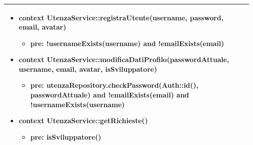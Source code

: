 \begin{tabular}{|| l | p{34em} ||}
\begin{itemize}[leftmargin=*]
	\item \textbf{context} UtenzaService::registraUtente(username, password, email, avatar)
	\begin{itemize}
		\item[ ] \textbf{pre:} !usernameExists(username) and !emailExists(email)
	\end{itemize}

	\item \textbf{context} UtenzaService::modificaDatiProfilo(passwordAttuale, username, email, avatar, isSviluppatore)
	\begin{itemize}
		\item[ ] \textbf{pre:} utenzaRepository.checkPassword(Auth::id(), passwordAttuale) and !emailExists(email) and !usernameExists(username)
	\end{itemize}

	\item \textbf{context} UtenzaService::getRichieste()
	\begin{itemize}
		\item[ ] \textbf{pre:} isSviluppatore()
	\end{itemize}

\end{itemize}\\
\hline
\end{tabular}

\newpage

